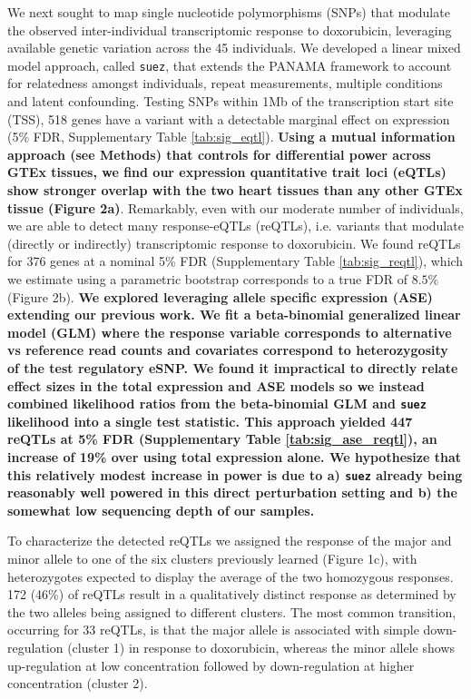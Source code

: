 \documentclass{article}
\newcommand{\tempbold}[1]{\textbf{#1}}
\begin{document}
We next sought to map single nucleotide polymorphisms (SNPs) that modulate the observed inter-individual transcriptomic response to doxorubicin, leveraging available genetic variation across the 45 individuals\cite{Livne2015}. We developed a linear mixed model approach, called \texttt{suez}, that extends the PANAMA framework\citep{Fusi2012} to account for relatedness amongst individuals, repeat measurements, multiple conditions and latent confounding. Testing SNPs within 1Mb of the transcription start site (TSS), 518 genes have a variant with a detectable marginal effect on expression (5\% FDR, Supplementary Table \ref{tab:sig_eqtl}). \tempbold{Using a mutual information approach (see Methods) that controls for differential power across GTEx tissues, we find our expression quantitative trait loci (eQTLs) show stronger overlap with the two heart tissues than any other GTEx tissue (Figure 2a)}. Remarkably, even with our moderate number of individuals, we are able to detect many response-eQTLs (reQTLs), i.e. variants that modulate (directly or indirectly) transcriptomic response to doxorubicin. We found reQTLs for 376 genes at a nominal 5\% FDR (Supplementary Table \ref{tab:sig_reqtl}), which we estimate using a parametric bootstrap corresponds to a true FDR of $8.5\%$ (Figure 2b). \tempbold{We explored leveraging allele specific expression (ASE) extending our previous work\cite{Knowles2017-yp,Van_de_Geijn2015-nm}. We fit a beta-binomial generalized linear model (GLM) where the response variable corresponds to alternative vs reference read counts and covariates correspond to heterozygosity of the test regulatory eSNP. We found it impractical to directly relate effect sizes in the total expression and ASE models so we instead combined likelihood ratios from the beta-binomial GLM and \texttt{suez} likelihood into a single test statistic. This approach yielded 447 reQTLs at 5\% FDR (Supplementary Table \ref{tab:sig_ase_reqtl}), an increase of 19\% over using total expression alone. We hypothesize that this relatively modest increase in power is due to a) \texttt{suez} already being reasonably well powered in this direct perturbation setting and b) the somewhat low sequencing depth of our samples.}

To characterize the detected reQTLs we assigned the response of the major and minor allele to one of the six clusters previously learned (Figure 1c), with heterozygotes expected to display the average of the two homozygous responses. 172 (46\%) of reQTLs result in a qualitatively distinct response as determined by the two alleles being assigned to different clusters. The most common transition, occurring for 33 reQTLs, is that the major allele is associated with simple down-regulation (cluster 1) in response to doxorubicin, whereas the minor allele shows up-regulation at low concentration followed by down-regulation at higher concentration (cluster 2). 
\end{document}
